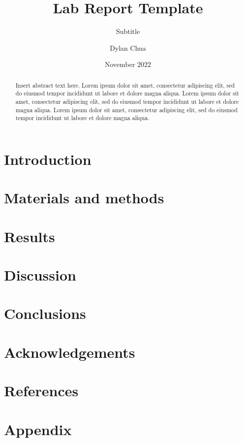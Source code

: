 \documentclass{report}
\title{Lab Report Template}
\subtitle{Subtitle}
\author{Dylan Chua}
\date{November 2022}
\begin{document}
\frontmatter
\titlepage

\begin{abstract}
    Insert abstract text here. Lorem ipsum dolor sit amet, consectetur adipiscing elit, sed do eiusmod tempor incididunt ut labore et dolore magna aliqua. Lorem ipsum dolor sit amet, consectetur adipiscing elit, sed do eiusmod tempor incididunt ut labore et dolore magna aliqua. Lorem ipsum dolor sit amet, consectetur adipiscing elit, sed do eiusmod tempor incididunt ut labore et dolore magna aliqua.
\end{abstract}
\newpage

\tableofcontents
\newpage

\begin{nomen}
    

\end{nomen}
\newpage


\mainmatter
\section{Introduction}

\section{Materials and methods}

\section{Results}

\section{Discussion}

\section{Conclusions}

\section{Acknowledgements}

\section{References}

\section{Appendix}
\end{document}
